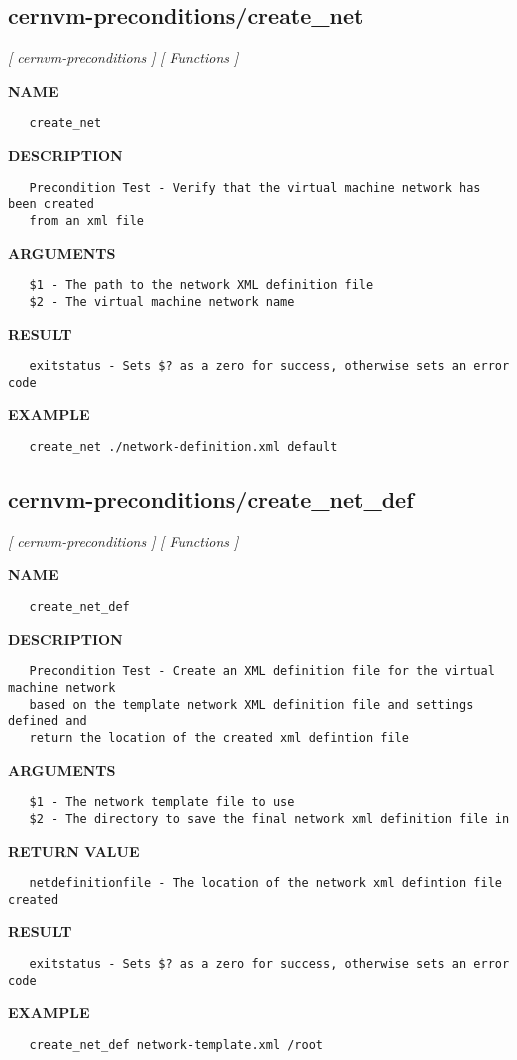\subsection{cernvm-preconditions/create\_net}
\textsl{[ cernvm-preconditions ]}
\textsl{[ Functions ]}

\label{ch:robo2}
\label{ch:cernvm_preconditions_create_net}
\textbf{NAME}
\begin{verbatim}
   create_net
\end{verbatim}
\textbf{DESCRIPTION}
\begin{verbatim}
   Precondition Test - Verify that the virtual machine network has been created 
   from an xml file
\end{verbatim}
\textbf{ARGUMENTS}
\begin{verbatim}
   $1 - The path to the network XML definition file
   $2 - The virtual machine network name 
\end{verbatim}
\textbf{RESULT}
\begin{verbatim}
   exitstatus - Sets $? as a zero for success, otherwise sets an error code
\end{verbatim}
\textbf{EXAMPLE}
\begin{verbatim}
   create_net ./network-definition.xml default
\end{verbatim}
\newpage
\subsection{cernvm-preconditions/create\_net\_def}
\textsl{[ cernvm-preconditions ]}
\textsl{[ Functions ]}

\label{ch:robo3}
\label{ch:cernvm_preconditions_create_net_def}
\textbf{NAME}
\begin{verbatim}
   create_net_def
\end{verbatim}
\textbf{DESCRIPTION}
\begin{verbatim}
   Precondition Test - Create an XML definition file for the virtual machine network
   based on the template network XML definition file and settings defined and 
   return the location of the created xml defintion file
\end{verbatim}
\textbf{ARGUMENTS}
\begin{verbatim}
   $1 - The network template file to use
   $2 - The directory to save the final network xml definition file in
\end{verbatim}
\textbf{RETURN VALUE}
\begin{verbatim}
   netdefinitionfile - The location of the network xml defintion file created
\end{verbatim}
\textbf{RESULT}
\begin{verbatim}
   exitstatus - Sets $? as a zero for success, otherwise sets an error code
\end{verbatim}
\textbf{EXAMPLE}
\begin{verbatim}
   create_net_def network-template.xml /root
\end{verbatim}
\newpage
